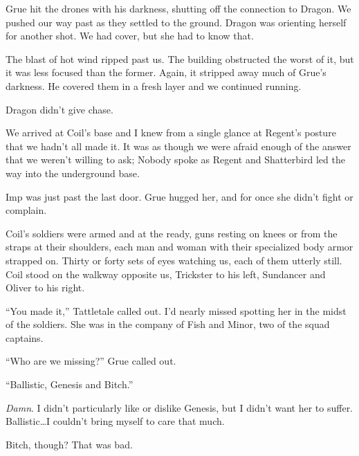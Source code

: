 Grue hit the drones with his darkness, shutting off the connection to Dragon.  We pushed our way past as they settled to the ground.  Dragon was orienting herself for another shot. We had cover, but she had to know that.



The blast of hot wind ripped past us.  The building obstructed the worst of it, but it was less focused than the former.  Again, it stripped away much of Grue's darkness.  He covered them in a fresh layer and we continued running.



Dragon didn't give chase.



\sectionbreak



We arrived at Coil's base and I knew from a single glance at Regent's posture that we hadn't all made it.  It was as though we were afraid enough of the answer that we weren't willing to ask; Nobody spoke as Regent and Shatterbird led the way into the underground base.



Imp was just past the last door.  Grue hugged her, and for once she didn't fight or complain.



Coil's soldiers were armed and at the ready, guns resting on knees or from the straps at their shoulders, each man and woman with their specialized body armor strapped on.  Thirty or forty sets of eyes watching us, each of them utterly still.  Coil stood on the walkway opposite us, Trickster to his left, Sundancer and Oliver to his right.



``You made it,'' Tattletale called out.  I'd nearly missed spotting her in the midst of the soldiers.  She was in the company of Fish and Minor, two of the squad captains.



``Who are we missing?'' Grue called out.



``Ballistic, Genesis and Bitch.''



\emph{Damn}.  I didn't particularly like or dislike Genesis, but I didn't want her to suffer.  Ballistic\ldots I couldn't bring myself to care that much.



Bitch, though?  That was bad.



